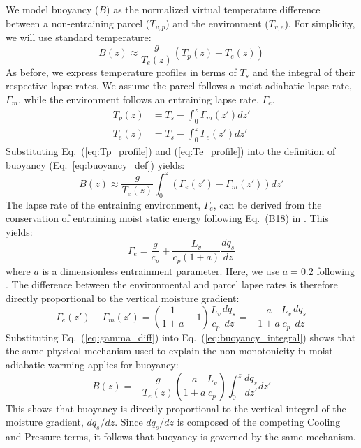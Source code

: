 \documentclass{ametsocV6.1}
\begin{document}
We model buoyancy ($B$) as the normalized virtual temperature difference between a non-entraining parcel ($T_{v,p}$) and the environment ($T_{v,e}$). For simplicity, we will use standard temperature:
\begin{equation}
B(z)\approx\frac{g}{T_e(z)}(T_p(z)-T_e(z)) \label{eq:buoyancy_def}
\end{equation}
As before, we express temperature profiles in terms of $T_s$ and the integral of their respective lapse rates. We assume the parcel follows a moist adiabatic lapse rate, $\Gamma_m$, while the environment follows an entraining lapse rate, $\Gamma_e$.
\begin{align}
T_p(z)&=T_s-\int_0^z \Gamma_m(z')dz' \label{eq:Tp_profile} \\
T_e(z)&=T_s-\int_0^z \Gamma_e(z')dz' \label{eq:Te_profile}
\end{align}
Substituting Eq.~(\ref{eq:Tp_profile}) and (\ref{eq:Te_profile}) into the definition of buoyancy (Eq.~\ref{eq:buoyancy_def}) yields:
\begin{equation}
B(z)\approx\frac{g}{T_e(z)}\int_0^z(\Gamma_e(z')-\Gamma_m(z'))dz' \label{eq:buoyancy_integral}
\end{equation}
The lapse rate of the entraining environment, $\Gamma_e$, can be derived from the conservation of entraining moist static energy following Eq.~(B18) in \cite{romps2016}. This yields:
\begin{equation}
\Gamma_e = \frac{g}{c_p} + \frac{L_v}{c_p(1+a)}\frac{dq_s}{dz} \label{eq:gamma_e}
\end{equation}
where $a$ is a dimensionless entrainment parameter. Here, we use $a=0.2$ following \cite{romps2016}. The difference between the environmental and parcel lapse rates is therefore directly proportional to the vertical moisture gradient:
\begin{equation}
\Gamma_e(z')-\Gamma_m(z')=\left(\frac{1}{1+a}-1\right)\frac{L_v}{c_p}\frac{dq_s}{dz}=-\frac{a}{1+a}\frac{L_v}{c_p}\frac{dq_s}{dz} \label{eq:gamma_diff}
\end{equation}
Substituting Eq.~(\ref{eq:gamma_diff}) into Eq.~(\ref{eq:buoyancy_integral}) shows that the same physical mechanism used to explain the non-monotonicity in moist adiabatic warming applies for buoyancy:
\begin{equation}
B(z)=-\frac{g}{T_e(z)}\left(\frac{a}{1+a}\frac{L_v}{c_p}\right)\int_0^z\frac{dq_s}{dz'}dz' \label{eq:buoyancy_final}
\end{equation}
This shows that buoyancy is directly proportional to the vertical integral of the moisture gradient, $dq_s/dz$. Since $dq_s/dz$ is composed of the competing Cooling and Pressure terms, it follows that buoyancy is governed by the same mechanism.
\end{document}
